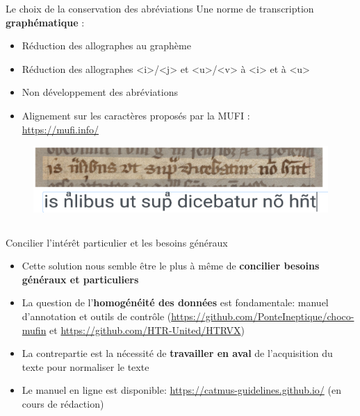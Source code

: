 \documentclass[11pt,aspectratio=169]{beamer}
\let\cite\parencite
\begin{document}
\begin{frame}{Le choix de la conservation des abréviations}
\color{black}Une norme de transcription \textbf{graphématique} \cite{stutzmann_PaleographieStatistiquePour_2010}:
\begin{center}
\begin{itemize}
\item Réduction des allographes au graphème
\item Réduction des allographes <i>/<j> et <u>/<v> à <i> et à <u>
\item Non développement des abréviations
\item Alignement sur les caractères proposés par la MUFI \cite{haugen_DealingGlyphsCharacters_2013}:\\ \url{https://mufi.info/}
\end{itemize}
\pause\begin{figure}
\includegraphics[width=.8\textwidth]{img/exemple_transcription.png}
\end{figure}
\end{center}
\end{frame}


\subsection{}


\begin{frame}{Concilier l'intérêt particulier et les besoins généraux}
\begin{center}
\begin{itemize}
\item Cette solution nous semble être le plus à même de \textbf{concilier besoins généraux et particuliers}
\item La question de l'\textbf{homogénéité des données} est fondamentale: manuel d'annotation et outils de contrôle (\url{https://github.com/PonteIneptique/choco-mufin} et \url{https://github.com/HTR-United/HTRVX})
\item La contrepartie est la nécessité de \textbf{travailler en aval} de l'acquisition du texte pour normaliser le texte
\item Le manuel en ligne est disponible: \url{https://catmus-guidelines.github.io/} (en cours de rédaction)
\end{itemize}
\end{center}
\end{frame}
\end{document}
